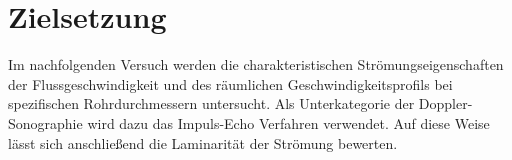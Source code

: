 \section{Zielsetzung}
\label{sec:zielsetzung}

Im nachfolgenden Versuch werden die charakteristischen Strömungseigenschaften der Flussgeschwindigkeit und des räumlichen
Geschwindigkeitsprofils bei spezifischen Rohrdurchmessern untersucht. Als Unterkategorie der Doppler-Sonographie wird dazu
das Impuls-Echo Verfahren verwendet. Auf diese Weise lässt sich anschließend die Laminarität der Strömung bewerten.
